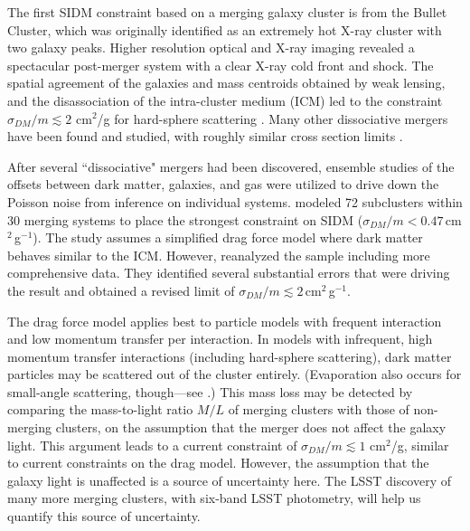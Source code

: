 
The first SIDM constraint based on a merging galaxy cluster is from the Bullet Cluster, which was originally identified as an extremely hot X-ray cluster with two galaxy peaks. Higher resolution optical and X-ray imaging revealed a spectacular post-merger system with a clear X-ray cold front and shock. The spatial agreement of the galaxies and mass centroids obtained by weak lensing, and the disassociation of the intra-cluster medium (ICM) led to the constraint $\sigma_{DM}/m \lesssim 2$ cm$^2$/g for hard-sphere scattering \citep{Markevitch2004,Randall:2007ph,Robertson17BC,Robertson:2016qef}. Many other dissociative mergers have been found and studied, with roughly similar cross section limits \citep[but with greater systematic uncertainty, \eg][]{bradac2008}. 

After several ``dissociative" mergers had been discovered, ensemble studies of the offsets between dark matter, galaxies, and gas were utilized to drive down the Poisson noise from inference on individual systems. \citet{1503.07675} modeled 72 subclusters within 30 merging systems to place the strongest constraint on SIDM ($\sigma_{DM}/m<0.47$\,cm$^{2}$\,g$^{-1}$).
The study assumes a simplified drag force model where dark matter behaves similar to the ICM. However, \citet{1701.05877} reanalyzed the sample including more comprehensive data. They identified several substantial errors that were driving the result and obtained a revised limit of $\sigma_{DM}/m\lesssim 2$\,cm$^{2}$\,g$^{-1}$.

The drag force model applies best to particle models with frequent interaction and low momentum transfer per interaction. In models with infrequent, high momentum transfer interactions (including hard-sphere scattering), dark matter particles may be scattered out of the cluster entirely. (Evaporation also occurs for small-angle scattering, though---see \citep{Kahlhoefer:2013dca}.) This mass loss may be detected by comparing the mass-to-light ratio $M/L$ of merging clusters with those of non-merging clusters, on the assumption that the merger does not affect the galaxy light. This argument leads to a current constraint of $\sigma_{DM}/m \lesssim 1$ cm$^2$/g, similar to current constraints on the drag model. However, the assumption that the galaxy light is unaffected is a source of uncertainty here. The LSST discovery of many more merging clusters, with six-band LSST photometry, will help us quantify this source of uncertainty. 

